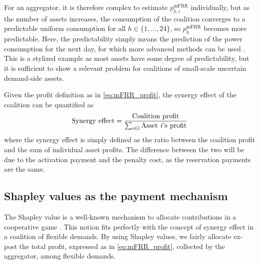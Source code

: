 \documentclass[conference]{IEEEtran}
\begin{document}
For an aggregator, it is therefore complex to estimate $p^{\text{mFRR}}_{h, i}$ individually, but as the number of assets increases, the consumption of the coalition converges to a predictable uniform consumption for all $h \in \{1, \hdots, 24 \}$, so $p^{\text{mFRR}}_{h}$ becomes more predictable. Here, the predictability simply means the prediction of the power consumption for the next day, for which more advanced methods can be used \cite{ziras2021baselines}.
This is a stylized example as most assets have some degree of predictability, but it is sufficient to show a relevant problem for coalitions of small-scale uncertain demand-side assets. 

Given the profit definition as in \eqref{eq:mFRR_profit}, the synergy effect of the coalition can be quantified as
%
\begin{align}\label{eq:synergy_effect}
    \text{Synergy effect} = \frac{ \text{Coalition profit} }{ \sum_{i \in \mathbb{I}} \text{Asset \textit{i}'s profit} }
\end{align}
where the synergy effect is simply defined as the ratio between the coalition profit and the sum of individual asset profits. The difference between the two will be due to the activation payment and the penalty cost, as the reservation payments are the same.

\subsection{Shapley values as the payment mechanism}
%
The Shapley value is a well-known mechanism to allocate contributions in a cooperative game \cite{shapley1997value}. This notion fits perfectly with the concept of synergy effect in a coalition of flexible demands. By using Shapley values, we fairly allocate ex-post the total profit, expressed as in \eqref{eq:mFRR_profit}, collected by the aggregator, among flexible demands.


\end{document}

